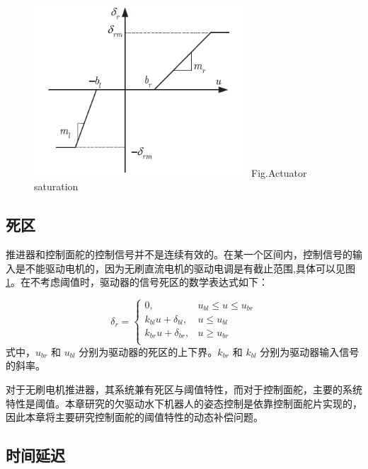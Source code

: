 \begin{figure}[!htp]
\centering
 \includegraphics[width=8cm]{figure/chap6/sat.png}
 \label{fig:chap6:F1}
  {Fig.}{Actuator saturation}
\end{figure}

\subsection{死区 }

推进器和控制面舵的控制信号并不是连续有效的。在某一个区间内，控制信号的输入是不能驱动电机的，因为无刷直流电机的驱动电调是有截止范围,具体可以见图\ref{fig:chap6:F1}。在不考虑阈值时，驱动器的信号死区的数学表达式如下：

\begin{equation}
\label{eq:chap6:sat}
\delta_{r} = \left\{
\begin{matrix}
0  ,&  u_{bl} \leq u \leq u_{br}  \\
k_{bl}u + \delta_{bl} ,&   u \leq u_{bl} \\
k_{br}u + \delta_{br} ,&   u \geq u_{br} \\
\end{matrix}\right.
\end{equation}
式中，$u_{br}$ 和 $u_{bl}$ 分别为驱动器的死区的上下界。$k_{br}$ 和 $k_{bl}$ 分别为驱动器输入信号的斜率。

对于无刷电机推进器，其系统兼有死区与阈值特性，而对于控制面舵，主要的系统特性是阈值。本章研究的欠驱动水下机器人的姿态控制是依靠控制面舵片实现的，因此本章将主要研究控制面舵的阈值特性的动态补偿问题。

\subsection{时间延迟 }

